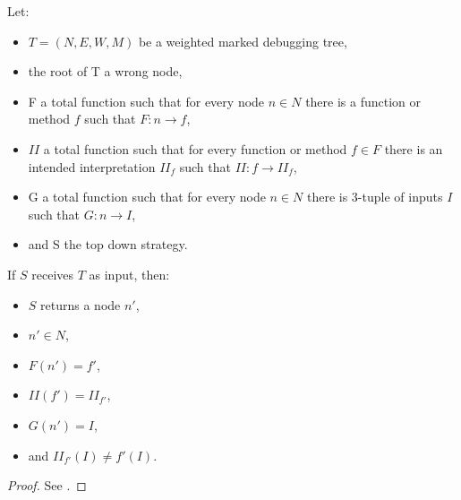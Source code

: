 \begin{theorem}[Soundness]
Let:
\begin{itemize}
    \item \(T = (N,E,W,M)\) be a weighted marked debugging tree,
    \item the root of T a wrong node,
    \item F a total function such that for every node \(n\in N\) there is a function or method \(f\) such that \(F:n\to f\),
    \item \(\mathit{II}\) a total function such that for every function or method \(f\in F\) there is an intended interpretation \(\mathit{II}_f\) such that \(\mathit{II}:f\to \mathit{II}_f\),
    \item G a total function such that for every node \(n\in N\) there is 3-tuple of inputs \(I\) such that \(G:n\to I\),
    \item and S the top down strategy.
\end{itemize}

If \(S\) receives \(T\) as input, then:
\begin{itemize}
    \item \(S\) returns a node \(n'\),
    \item \(n'\in N\),
    \item \(F(n') = f'\),
    \item \(\mathit{II}(f') = II_{f'}\),
    \item \(G(n') = I\),
    \item and \(II_{f'}(I)\neq f'(I)\).
\end{itemize}
\end{theorem}
\begin{proof}
See \cite{DeclarativeErrorDiagnosis}.
\end{proof}

